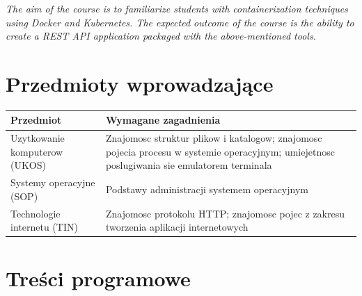 \documentclass[12pt, a4paper]{article}
\newcommand{\thdrule}{\noalign{\global\setlength{\extrarowheight}{0pt}}}
\newcommand{\thdend}{\noalign{\global\setlength{\extrarowheight}{3pt}}}
\begin{document}
\textit{The aim of the course is to familiarize students with containerization techniques using Docker and Kubernetes. The expected outcome of the course is the ability to create a REST API application packaged with the above-mentioned tools.}


\section{Przedmioty wprowadzające}

{\scriptsize
\begin{tabularx}{\textwidth}{m{5cm}Y}
\thdrule\toprule
{} {\color{white}\textbf{Przedmiot}} & {\color{white}\textbf{Wymagane zagadnienia}} \\
\midrule\thdend
   Uzytkowanie komputerow (UKOS) & Znajomosc struktur plikow i katalogow; znajomosc pojecia procesu w systemie operacyjnym; umiejetnosc poslugiwania sie emulatorem terminala \\
   Systemy operacyjne (SOP) & Podstawy administracji systemem operacyjnym \\
   Technologie internetu (TIN) & Znajomosc protokolu HTTP; znajomosc pojec z zakresu tworzenia aplikacji internetowych \\
\bottomrule
\end{tabularx}}

\section{Treści programowe}
\end{document}
